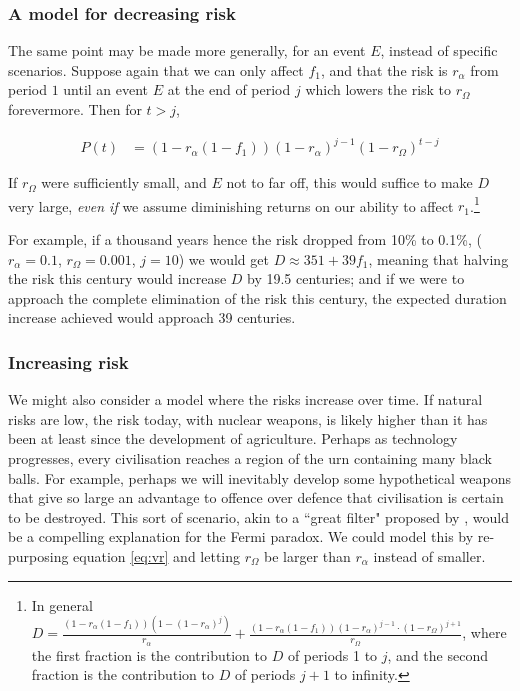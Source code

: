 \documentclass[british]{article}
\begin{document}
\subsubsection{A model for decreasing risk} The same point may be made more generally, for an event $E$, instead of specific scenarios. Suppose again that we can only affect $f_1$, and that the risk is $r_\alpha$ from period $1$ until an event \(E\) at the end of period \(j\) which lowers the risk to $r_\Omega$ forevermore. Then for $t>j$,


\begin{align}
P(t) &= (1-r_\alpha(1-f_1)) (1-r_\alpha)^{j-1} (1-r_\Omega)^{t-j} \label{eq:vr}
\end{align}

If $r_\Omega$ were sufficiently small, and $E$ not to far off, this would suffice to make $D$ very large, \emph{even if} we assume diminishing returns on our ability to affect $r_1$.\footnote{In general $D=  \frac{(1-r_\alpha(1-f_1)) (1-(1 - r_\alpha)^j)}{r_\alpha} + \frac{(1-r_\alpha(1-f_1)) (1-r_\alpha)^{j-1} \cdot (1-r_\Omega)^{j+1}}{r_\Omega}$, where the first fraction is the contribution to $D$ of periods 1 to $j$, and the second fraction is the contribution to $D$ of periods $j+1$ to infinity.} 

For example, if a thousand years hence the risk dropped from 10\% to 0.1\%, ($r_\alpha=0.1$, $r_\Omega=0.001$, $j=10$) we would get $D\approx 351+ 39f_1$, meaning that halving the risk this century would increase $D$ by 19.5 centuries; and if we were to approach the complete elimination of the risk this century, the expected duration increase achieved would approach 39 centuries.

\subsubsection{Increasing risk} We might also consider a model where the risks increase over time. If natural risks are low, the risk today, with nuclear weapons, is likely higher than it has been at least since the development of agriculture. Perhaps as technology progresses, every civilisation reaches a region of the urn containing many black balls. For example, perhaps we will inevitably develop some hypothetical weapons that give so large an advantage to offence over defence that civilisation is certain to be destroyed. This sort of scenario, akin to a ``great filter" proposed by \cite{hanson_great_1998}, would be a compelling explanation for the Fermi paradox. We could model this by re-purposing equation \ref{eq:vr} and letting $r_\Omega$ be larger than $r_\alpha$ instead of smaller.
\end{document}
